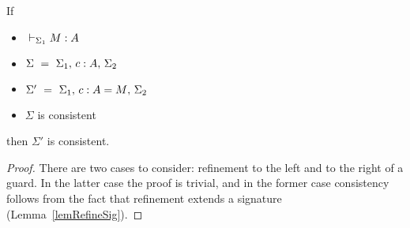 \begin{lemma} \label{lemRefineConsistent}
    If
    \begin{itemize}
	\item ${} \vdash_{\Sigma_1} {M} : {A}$
	\item $\Sigma ~ = ~ {\Sigma_1},\,{} {{c} : {A}},\,{} \Sigma_2$
	\item $\Sigma' ~ = ~ {\Sigma_1},\,{} {{c} : {A} = {M}},\,{} \Sigma_2$
	\item $\Sigma$ is consistent
    \end{itemize}
    then $\Sigma'$ is consistent.
\end{lemma}

\begin{proof}
    There are two cases to consider: refinement to the left and to the right of
    a guard. In the latter case the proof is trivial, and in the former case
    consistency follows from the fact that refinement extends a signature
    (Lemma~\ref{lemRefineSig}).
\end{proof}

